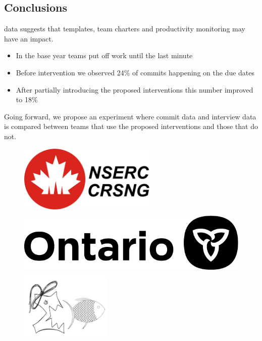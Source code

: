 \documentclass[poster, a0, plainboxedsections]{sciposter}
\begin{document}
\begin{multicols}{2}
\section{Conclusions}

 data suggests that templates, team charters and
productivity monitoring may have an impact.  

\begin{itemize}
\item In the base year teams put off work until the last minute
\item Before intervention we observed 24\% of commits happening on the due dates
\item After partially introducing the proposed interventions this number
improved to 18\%
\end{itemize}

Going forward, we propose
an experiment where commit data and interview data is compared between teams
that use the proposed interventions and those that do not.

\begin{figure}[htbp]
  \centering
  \includegraphics[height=3.2cm,trim={0 0 28.5cm 0},clip]{nserc-logo.jpg}
  \hspace{0.5cm}
  \includegraphics[height=3.2cm,trim={16.5cm 0 0 0},clip]{ontario@2x-print.png}
  \hspace{0.5cm}
  \includegraphics[height=3.2cm,trim={0 0.5cm 0 0.48cm},clip]{outreachlogo.png}  
\end{figure}
~\\


\end{multicols}
\end{document}
